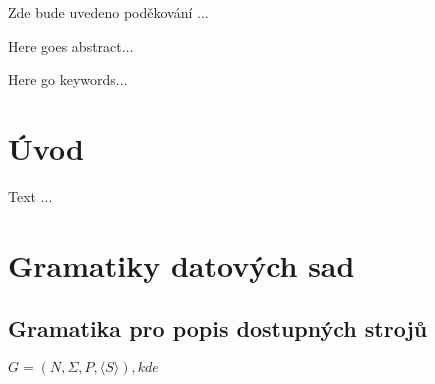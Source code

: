 \documentclass[draft]{fithesis}
\begin{document}
\FrontMatter
\ThesisTitlePage

\begin{ThesisDeclaration}
\DeclarationText
\AdvisorName
\end{ThesisDeclaration}

\begin{ThesisThanks}
Zde bude uvedeno poděkování ...
\end{ThesisThanks}

\begin{ThesisAbstract}
Here goes abstract...
\end{ThesisAbstract}

\begin{ThesisKeyWords}
Here go keywords...
\end{ThesisKeyWords}

\tableofcontents
\MainMatter

\chapter{Úvod}
Text ...

\appendix 

\chapter{Gramatiky datových sad}

\section{Gramatika pro popis dostupných strojů}

$G = (N, \Sigma, P,  \langle S  \rangle ), kde$
\end{document}
